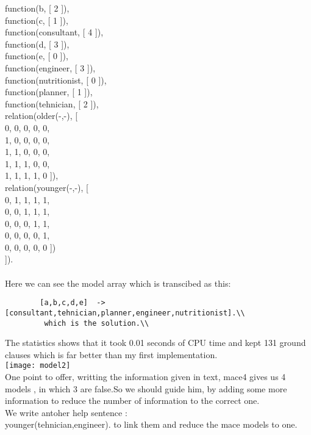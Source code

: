 \begin{itemize}
        function(b, [ 2 ]),\\

        function(c, [ 1 ]),\\

        function(consultant, [ 4 ]),\\

        function(d, [ 3 ]),\\

        function(e, [ 0 ]),\\

        function(engineer, [ 3 ]),\\

        function(nutritionist, [ 0 ]),\\

        function(planner, [ 1 ]),\\

        function(tehnician, [ 2 ]),\\

        relation(older(-,-), [\\
			   0, 0, 0, 0, 0,\\
			   1, 0, 0, 0, 0,\\
			   1, 1, 0, 0, 0,\\
			   1, 1, 1, 0, 0,\\
			   1, 1, 1, 1, 0 ]),\\

        relation(younger(-,-), [\\
			   0, 1, 1, 1, 1,\\
			   0, 0, 1, 1, 1,\\
			   0, 0, 0, 1, 1,\\
			   0, 0, 0, 0, 1,\\
			   0, 0, 0, 0, 0 ])\\
]).\\

	\tab \\Here we can see the model array which is transcibed as this:\\
		\begin{verbatim}
		[a,b,c,d,e]  ->[consultant,tehnician,planner,engineer,nutritionist].\\
		 which is the solution.\\
		\end{verbatim}
	\tab The statistics shows that it took 0.01 seconds of CPU time and kept 131 ground clauses which is far better than my first implementation.\\
		 \texttt{[image: model2]}\\

	\tab One point to offer, writting the information given in text, mace4 gives us 4 models , in which 3 are false.So we should guide him, by adding some more information to reduce the number of information to the correct one.\\
	\tab We write antoher help sentence :\\
		younger(tehnician,engineer). to link them and reduce the mace models to one.\\
	
\end{itemize}

